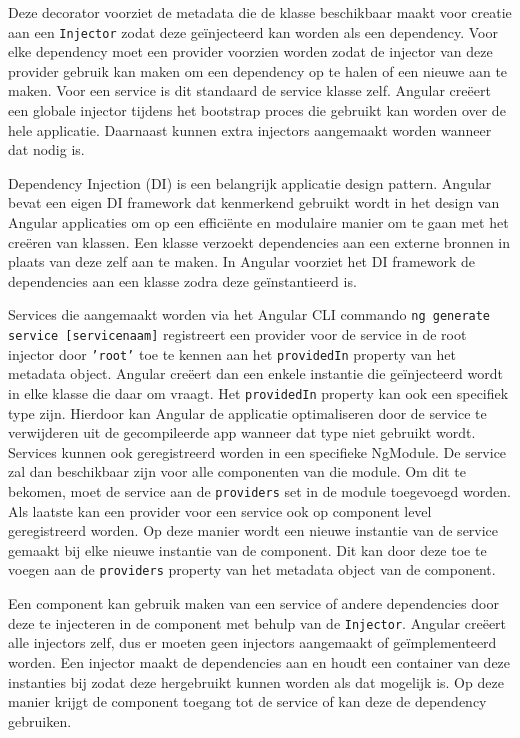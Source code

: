 Deze decorator voorziet de metadata die de klasse beschikbaar maakt voor creatie aan een \texttt{Injector} zodat deze geïnjecteerd kan worden als een dependency. Voor elke dependency moet een provider voorzien worden zodat de injector van deze provider gebruik kan maken om een dependency op te halen of een nieuwe aan te maken. Voor een service is dit standaard de service klasse zelf. Angular creëert een globale injector tijdens het bootstrap proces die gebruikt kan worden over de hele applicatie. Daarnaast kunnen extra injectors aangemaakt worden wanneer dat nodig is. \autocite{Angular2019d}

Dependency Injection (DI) is een belangrijk applicatie design pattern. Angular bevat een eigen DI framework dat kenmerkend gebruikt wordt in het design van Angular applicaties om op een efficiënte en modulaire manier om te gaan met het creëren van klassen. Een klasse verzoekt dependencies aan een externe bronnen in plaats van deze zelf aan te maken. In Angular voorziet het DI framework de dependencies aan een klasse zodra deze geïnstantieerd is. \autocite{Angular2019e}

Services die aangemaakt worden via het Angular CLI commando \texttt{ng generate service [servicenaam]} registreert een provider voor de service in de root injector door \texttt{'root'} toe te kennen aan het \texttt{providedIn} property van het metadata object. Angular creëert dan een enkele instantie die geïnjecteerd wordt in elke klasse die daar om vraagt. Het \texttt{providedIn} property kan ook een specifiek type zijn. Hierdoor kan Angular de applicatie optimaliseren door de service te verwijderen uit de gecompileerde app wanneer dat type niet gebruikt wordt. Services kunnen ook geregistreerd worden in een specifieke NgModule. De service zal dan beschikbaar zijn voor alle componenten van die module. Om dit te bekomen, moet de service aan de \texttt{providers} set in de module toegevoegd worden. Als laatste kan een provider voor een service ook op component level geregistreerd worden. Op deze manier wordt een nieuwe instantie van de service gemaakt bij elke nieuwe instantie van de component. Dit kan door deze toe te voegen aan de \texttt{providers} property van het metadata object van de component. \autocite{Angular2019d}

Een component kan gebruik maken van een service of andere dependencies door deze te injecteren in de component met behulp van de \texttt{Injector}. Angular creëert alle injectors zelf, dus er moeten geen injectors aangemaakt of geïmplementeerd worden. Een injector maakt de dependencies aan en houdt een container van deze instanties bij zodat deze hergebruikt kunnen worden als dat mogelijk is. Op deze manier krijgt de component toegang tot de service of kan deze de dependency gebruiken. \autocite{Angular2019d}

